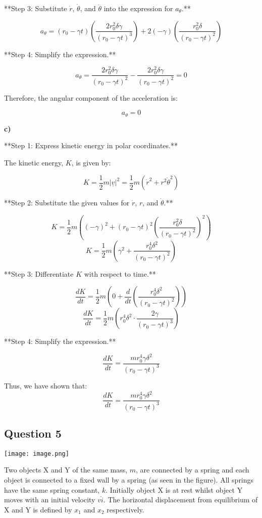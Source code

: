 \documentclass{article}
\begin{document}
**Step 3: Substitute $\dot{r}$, $\dot{\theta}$, and $\ddot{\theta}$ into the expression for $a_\theta$.**

\[a_\theta = (r_0 - \gamma t)\left(\frac{2r_0^2\delta\gamma}{(r_0 - \gamma t)^3}\right) + 2(-\gamma)\left(\frac{r_0^2\delta}{(r_0 - \gamma t)^2}\right)\]

**Step 4: Simplify the expression.**

\[a_\theta = \frac{2r_0^2\delta\gamma}{(r_0 - \gamma t)^2} - \frac{2r_0^2\delta\gamma}{(r_0 - \gamma t)^2} = 0\]

Therefore, the angular component of the acceleration is:

\[a_\theta = 0\]

\textbf{c)}

**Step 1: Express kinetic energy in polar coordinates.**

The kinetic energy, $K$, is given by:

\[K = \frac{1}{2}m|\underline{v}|^2 = \frac{1}{2}m(\dot{r}^2 + r^2\dot{\theta}^2)\]

**Step 2: Substitute the given values for $\dot{r}$, $r$, and $\dot{\theta}$.**

\[K = \frac{1}{2}m\left((-\gamma)^2 + (r_0 - \gamma t)^2\left(\frac{r_0^2\delta}{(r_0 - \gamma t)^2}\right)^2\right)\]
\[K = \frac{1}{2}m\left(\gamma^2 + \frac{r_0^4\delta^2}{(r_0 - \gamma t)^2}\right)\]

**Step 3: Differentiate $K$ with respect to time.**

\[\frac{dK}{dt} = \frac{1}{2}m\left(0 + \frac{d}{dt}\left(\frac{r_0^4\delta^2}{(r_0 - \gamma t)^2}\right)\right)\]
\[\frac{dK}{dt} = \frac{1}{2}m\left(r_0^4\delta^2 \cdot \frac{2\gamma}{(r_0 - \gamma t)^3}\right)\]

**Step 4: Simplify the expression.**

\[\frac{dK}{dt} = \frac{mr_0^4\gamma\delta^2}{(r_0 - \gamma t)^3}\]

Thus, we have shown that:
\[\frac{dK}{dt} = \frac{mr_0^4\gamma\delta^2}{(r_0 - \gamma t)^3}\]

\subsection{Question 5}

\begin{center}
\texttt{[image: image.png]} %
\end{center}

Two objects X and Y of the same mass, $m$, are connected by a spring and each object is connected
to a fixed wall by a spring (as seen in the figure). All springs have the same spring constant,
$k$. Initially object X is at rest whilst object Y moves with an initial velocity $v\hat{i}$. The horizontal
displacement from equilibrium of X and Y is defined by $x_1$ and $x_2$ respectively.
\end{document}
